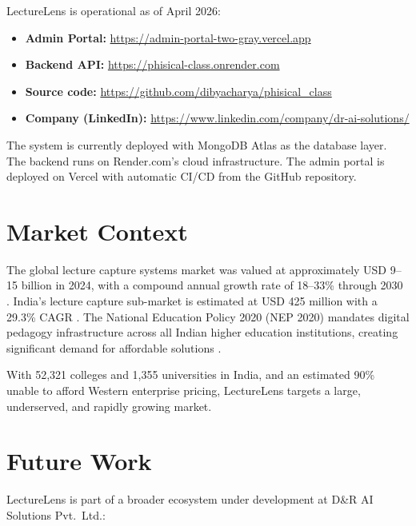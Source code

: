 \documentclass[12pt,a4paper]{article}
\begin{document}
LectureLens is operational as of April 2026:

\begin{itemize}
    \item \textbf{Admin Portal:} \url{https://admin-portal-two-gray.vercel.app}
    \item \textbf{Backend API:} \url{https://phisical-class.onrender.com}
    \item \textbf{Source code:} \url{https://github.com/dibyacharya/phisical_class}
    \item \textbf{Company (LinkedIn):} \url{https://www.linkedin.com/company/dr-ai-solutions/}
\end{itemize}

The system is currently deployed with MongoDB Atlas as the database layer. The backend runs on Render.com's cloud infrastructure. The admin portal is deployed on Vercel with automatic CI/CD from the GitHub repository.

\section{Market Context}

The global lecture capture systems market was valued at approximately USD 9--15 billion in 2024, with a compound annual growth rate of 18--33\% through 2030 \cite{mordor2024}. India's lecture capture sub-market is estimated at USD 425 million with a 29.3\% CAGR \cite{indiaMarket}. The National Education Policy 2020 (NEP 2020) mandates digital pedagogy infrastructure across all Indian higher education institutions, creating significant demand for affordable solutions \cite{nep2020}.

With 52{,}321 colleges and 1{,}355 universities in India, and an estimated 90\% unable to afford Western enterprise pricing, LectureLens targets a large, underserved, and rapidly growing market.

\section{Future Work}

LectureLens is part of a broader ecosystem under development at D\&R AI Solutions Pvt.\ Ltd.:
\end{document}
